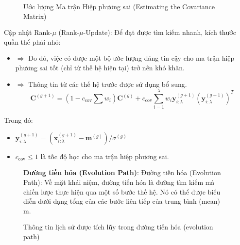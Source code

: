 \documentclass{book}
\begin{document}
\begin{itemize}
\begin{figure}[H]
            \caption{Ước lượng Ma trận Hiệp phương sai (Estimating the Covariance Matrix)}
            \label{fig:estimating_the_covariance_matrix} %
        \end{figure}
        \item Cập nhật Rank-$\mu$ (Rank-$\mu$-Update): Để đạt được tìm kiếm nhanh, kích thước quần thể phải nhỏ:
        \begin{itemize}
            \item[] $\Rightarrow$ Do đó, việc có được một bộ ước lượng đáng tin cậy cho ma trận hiệp phương sai tốt (chỉ từ thế hệ hiện tại) trở nên khó khăn.
            \item[] $\Rightarrow$ Thông tin từ các thế hệ trước được sử dụng bổ sung.
            \begin{equation*}
                \mathbf{C}^{(g+1)}=(1-c_{\operatorname{cov}}\sum w_i)\mathbf{C}^{(g)}+c_{\operatorname{cov}}\sum_{i=1}^{\lambda}w_i\mathbf{y}^{(g+1)}_{i:\lambda}(\mathbf{y}^{(g+1)}_{i:\lambda})^T %
            \end{equation*}
        \end{itemize}
        \item[] Trong đó:
        \begin{itemize}
            \item[] $\mathbf{y}_{i:\lambda}^{(g+1)}=(\mathbf{x}^{(g+1)}_{i:\lambda} - \mathbf{m}^{(g)})/\sigma^{(g)}$ %
            \item[] $c_{\operatorname{cov}}\leq 1$ là tốc độ học cho ma trận hiệp phương sai.
        \end{itemize}
        \begin{figure}[H]
            \begin{minipage}[c]{0.45\textwidth}
                \item \textbf{Đường tiến hóa (Evolution Path)}: Đường tiến hóa (Evolution Path): Về mặt khái niệm, đường tiến hóa là đường tìm kiếm mà chiến lược thực hiện qua một số bước thế hệ. Nó có thể được biểu diễn dưới dạng tổng của các bước liên tiếp của trung bình (mean) m.
                \item Thông tin lịch sử được tích lũy trong đường tiến hóa (evolution path)
            \end{minipage}\hfill
            \begin{minipage}[c]{0.45\textwidth}
                \centering

\end{minipage}
\end{figure}
\end{itemize}
\end{document}
